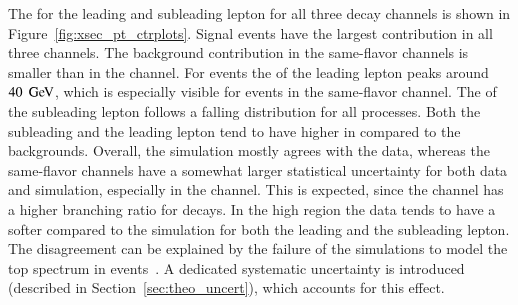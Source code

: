 The \pt for the leading and subleading lepton for all three decay channels is shown in Figure~\ref{fig:xsec_pt_ctrplots}.
Signal events have the largest contribution in all three channels. The background contribution in the same-flavor channels is smaller than in the \emu channel. 
For \ttbar events the \pt of the leading lepton peaks around $40\; \,\text{Ge\hspace{-.08em}V}$, which is especially visible for events in the same-flavor channel. The \pt of the subleading lepton follows a falling distribution for all processes. 
Both the subleading and the leading lepton tend to have higher \pt in \ttbar compared to the backgrounds.
Overall, the simulation mostly agrees with the data, whereas the same-flavor channels have a somewhat larger statistical uncertainty for both data and simulation, especially in the \ee channel.
This is expected, since the \emu channel has a higher branching ratio for \ttbar decays.
In the high \pt region the data tends to have a softer \pt compared to the simulation for both the leading and the subleading lepton.
The disagreement can be explained by the failure of the simulations to model the top \pt spectrum in \ttbar events~\cite{Khachatryan:2015oqa,Aad:2015mbv}. A dedicated systematic uncertainty is introduced (described in Section~\ref{sec:theo_uncert}), which accounts for this effect.


